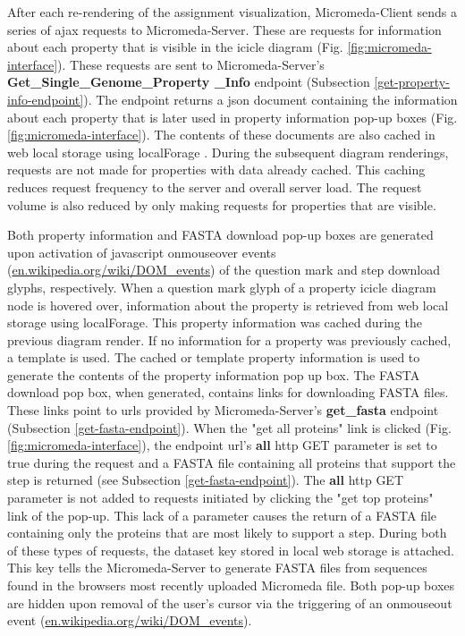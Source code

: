 After each re-rendering of the assignment visualization, Micromeda-Client sends a series of \gls{ajax}  requests to Micromeda-Server. These are requests for information about each property that is visible in the icicle diagram (Fig. \ref{fig:micromeda-interface}). These requests are sent to Micromeda-Server's \textbf{Get\_Single\_Genome\_Property \_Info} endpoint (Subsection \ref{get-property-info-endpoint}). The endpoint returns a \gls{json} document containing the information about each property that is later used in property information pop-up boxes (Fig. \ref{fig:micromeda-interface}). The contents of these documents are also cached in web local storage using localForage \cite{localforage}. During the subsequent diagram renderings, requests are not made for properties with data already cached. This caching reduces request frequency to the server and overall server load. The request volume is also reduced by only making requests for properties that are visible.

Both property information and FASTA download pop-up boxes are generated upon activation of \gls{javascript} onmouseover events \cite{dom-events} (\href{en.wikipedia.org/wiki/DOM\_events}{en.wikipedia.org/wiki/DOM\_events}) of the question mark and step download glyphs, respectively. When a question mark glyph of a property icicle diagram node is hovered over, information about the property is retrieved from web local storage using localForage. This property information was cached during the previous diagram render. If no information for a property was previously cached, a template is used. The cached or template property information is used to generate the contents of the property information pop up box. The FASTA download pop box, when generated, contains links for downloading FASTA files. These links point to \gls{url}s provided by Micromeda-Server's \textbf{get\_fasta} endpoint (Subsection \ref{get-fasta-endpoint}). When the "get all proteins" link is clicked (Fig. \ref{fig:micromeda-interface}), the endpoint \gls{url}'s \textbf{all} \gls{http} GET parameter is set to true during the request and a FASTA file containing all proteins that support the step is returned (see Subsection \ref{get-fasta-endpoint}). The \textbf{all} \gls{http} GET parameter is not added to requests initiated by clicking the "get top proteins" link of the pop-up. This lack of a parameter causes the return of a FASTA file containing only the proteins that are most likely to support a step. During both of these types of requests, the dataset key stored in local web storage is attached. This key tells the Micromeda-Server to generate FASTA files from sequences found in the browsers most recently uploaded Micromeda file. Both pop-up boxes are hidden upon removal of the user's cursor via the triggering of an onmouseout event \cite{dom-events} (\href{en.wikipedia.org/wiki/DOM\_events}{en.wikipedia.org/wiki/DOM\_events}).

